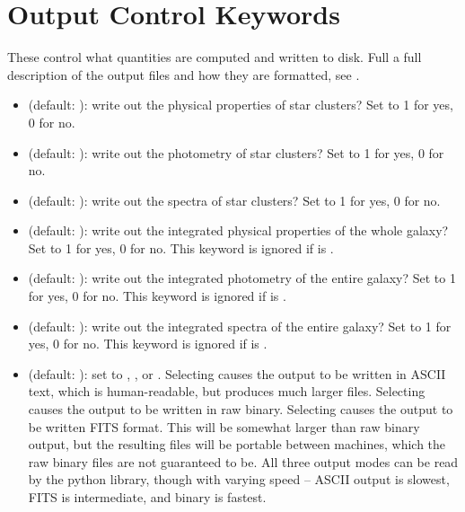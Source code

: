 \documentclass[letterpaper,10pt,english]{sphinxmanual}
\begin{document}
\section{Output Control Keywords}
\label{parameters:output-control-keywords}
These control what quantities are computed and written to disk. Full a full description of the output files and how they are formatted, see {\hyperref[output:sec-output]{\emph{}}}.
\begin{itemize}
\item {} 
 (default: ): write out the physical properties of star clusters? Set to 1 for yes, 0 for no.

\item {} 
 (default: ): write out the photometry of star clusters? Set to 1 for yes, 0 for no.

\item {} 
 (default: ): write out the spectra of star clusters? Set to 1 for yes, 0 for no.

\item {} 
 (default: ): write out the integrated physical properties of the whole galaxy? Set to 1 for yes, 0 for no. This keyword is ignored if  is .

\item {} 
 (default: ): write out the integrated photometry of the entire galaxy? Set to 1 for yes, 0 for no. This keyword is ignored if  is .

\item {} 
 (default: ): write out the integrated spectra of the entire galaxy? Set to 1 for yes, 0 for no. This keyword is ignored if  is .

\item {} 
 (default: ): set to , , or . Selecting  causes the output to be written in ASCII text, which is human-readable, but produces much larger files. Selecting  causes the output to be written in raw binary. Selecting  causes the output to be written FITS format. This will be somewhat larger than raw binary output, but the resulting files will be portable between machines, which the raw binary files are not guaranteed to be. All three output modes can be read by the python library, though with varying speed -- ASCII output is slowest, FITS is intermediate, and binary is fastest.

\end{itemize}
\end{document}
